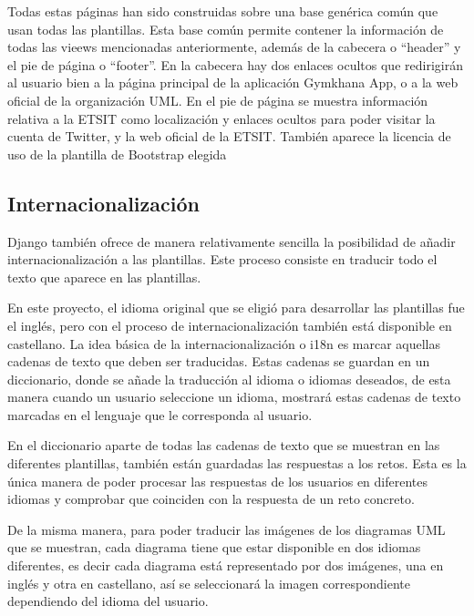 \documentclass[a4paper, 12pt]{book}
\begin{document}
Todas estas páginas han sido construidas sobre una base genérica común que usan todas las plantillas. Esta base común permite contener la información de todas las vieews mencionadas anteriormente, además de la cabecera o ``header'' y el pie de página o ``footer''. En la cabecera hay dos enlaces ocultos que redirigirán al usuario bien a la página principal de la aplicación Gymkhana App, o a la web oficial de la organización UML. En el pie de página se muestra información relativa a la ETSIT como localización y enlaces ocultos para poder visitar la cuenta de Twitter, y la web oficial de la ETSIT. También aparece la licencia de uso de la plantilla de Bootstrap elegida

\subsection{Internacionalización}
Django también ofrece de manera relativamente sencilla la posibilidad de añadir internacionalización a las plantillas. Este proceso consiste en traducir todo el texto que aparece en las plantillas. 

En este proyecto, el idioma original que se eligió para desarrollar las plantillas fue el inglés, pero con el proceso de internacionalización también está disponible en castellano. La idea básica de la internacionalización o i18n es marcar aquellas cadenas de texto que deben ser traducidas. Estas cadenas se guardan en un diccionario, donde se añade la traducción al idioma o idiomas deseados, de esta manera cuando un usuario seleccione un idioma, mostrará estas cadenas de texto marcadas en el lenguaje que le corresponda al usuario. 

En el diccionario aparte de todas las cadenas de texto que se muestran en las diferentes plantillas, también están guardadas las respuestas a los retos. Esta es la única manera de poder procesar las respuestas de los usuarios en diferentes idiomas y comprobar que coinciden con la respuesta de un reto concreto. 

De la misma manera, para poder traducir las imágenes de los diagramas UML que se muestran, cada diagrama tiene que estar disponible en dos idiomas diferentes, es decir cada diagrama está representado por dos imágenes, una en inglés y otra en castellano, así se seleccionará la imagen correspondiente dependiendo del idioma del usuario. 
\end{document}

